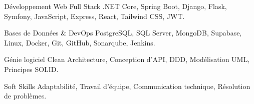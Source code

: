 

\begin{cvskills}

  \cvskill
    {Développement Web Full Stack} %
    {.NET Core, Spring Boot, Django, Flask, Symfony, JavaScript, Express, React, Tailwind CSS, JWT.} %

  \cvskill
    {Bases de Données \& DevOps} %
    {PostgreSQL, SQL Server, MongoDB, Supabase, Linux, Docker, Git, GitHub, Sonarqube, Jenkins.} %

  \cvskill
    {Génie logiciel} %
    {Clean Architecture, Conception d'API, DDD, Modélisation UML, Principes SOLID.} %

  \cvskill
    {Soft Skills} %
    {Adaptabilité, Travail d'équipe, Communication technique, Résolution de problèmes.} %

\end{cvskills}
